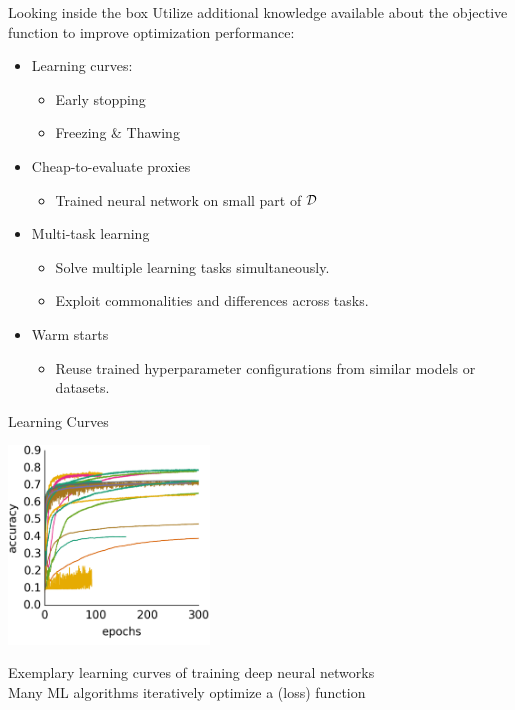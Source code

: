 \begin{frame}{Looking inside the box}
Utilize additional knowledge available about the objective function to improve optimization performance:
\begin{itemize}
    \item Learning curves:
    \begin{itemize}
        \item Early stopping
        \item Freezing \& Thawing
    \end{itemize}
    \item Cheap-to-evaluate proxies
    \begin{itemize}
        \item Trained neural network on small part of $\mathcal{D}$ 
    \end{itemize}
    \item Multi-task learning
    \begin{itemize}
        \item Solve multiple learning tasks simultaneously.
        \item Exploit commonalities and differences across tasks.
    \end{itemize}
    \item Warm starts
    \begin{itemize}
        \item Reuse trained hyperparameter configurations from similar models or datasets.
    \end{itemize}
\end{itemize}
\end{frame}
\begin{frame}{Learning Curves}

\centering
\includegraphics[width=0.4\textwidth]{w07_hpo_grey_box/images/intro/learning_curves.png}

Exemplary learning curves of training deep neural networks\\
Many ML algorithms iteratively optimize a (loss) function

\end{frame}
